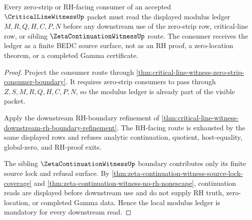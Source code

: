 \begin{theorem}
\label{thm:critical-line-witness-modulus-ledger-exhaustion}
Every zero-strip or RH-facing consumer of an accepted $\CriticalLineWitnessUp$ packet must read the displayed modulus ledger $M,R,Q,H,C,P,N$ before any downstream use of the zero-strip row, critical-line row, or sibling $\ZetaContinuationWitnessUp$ route. The consumer receives the ledger as a finite BEDC source surface, not as an RH proof, a zero-location theorem, or a completed Gamma certificate.
\end{theorem}
\begin{proof}
Project the consumer route through \autoref{thm:critical-line-witness-zero-strip-consumer-boundary}. It requires zero-strip consumers to pass through $Z,S,M,R,Q,H,C,P,N$, so the modulus ledger is already part of the visible packet.

Apply the downstream RH-boundary refinement of \autoref{thm:critical-line-witness-downstream-rh-boundary-refinement}. The RH-facing route is exhausted by the same displayed rows and refuses analytic continuation, quotient, host-equality, global-zero, and RH-proof exits.

The sibling $\ZetaContinuationWitnessUp$ boundary contributes only its finite source lock and refusal surface. By \autoref{thm:zeta-continuation-witness-source-lock-coverage} and \autoref{thm:zeta-continuation-witness-no-rh-nonescape}, continuation reads are displayed before downstream use and do not supply RH truth, zero-location, or completed Gamma data. Hence the local modulus ledger is mandatory for every downstream read.
\end{proof}

